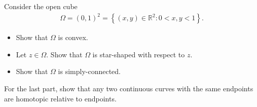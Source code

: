 \documentclass[11pt]{article}
\begin{document}
\begin{exercise}
    Consider the open cube 
    \begin{align*}
        \Omega = (0,1)^2 = \left\{ (x,y) \in \mathbb R^2 : 0 < x,y < 1 \right\}. 
    \end{align*}
    \begin{itemize}
        \item Show that $\Omega$ is convex.
        \item Let $z \in \Omega$. Show that $\Omega$ is star-shaped with respect to $z$.
        \item Show that $\Omega$ is simply-connected.
    \end{itemize}
    For the last part, show that any two continuous curves with the same endpoints are homotopic relative to endpoints. 
\end{exercise}
\end{document}
